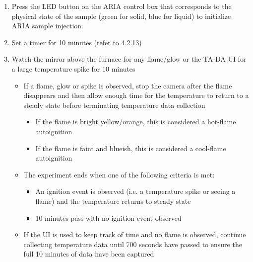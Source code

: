 \documentclass[letterpaper,11pt]{article}
\begin{document}
\begin{enumerate}
	\item Press the LED button on the ARIA control box that corresponds to the physical state of the sample
		(green for solid, blue for liquid) to initialize ARIA sample injection.
	
	\item Set a timer for 10 minutes (refer to 4.2.13)
            
    \item Watch the mirror above the furnace for any flame/glow or the TA-DA UI
        for a large temperature spike for 10 minutes
        \begin{itemize}
        \item If a flame, glow or spike is observed, stop the camera after the 
            flame disappears and then allow enough time for the temperature to 
            return to a steady state before terminating temperature data 
            collection
                \begin{itemize}
                \item If the flame is bright yellow/orange, this is considered a 
                    hot-flame autoignition
                \item If the flame is faint and blueish, this is considered a 
                    cool-flame autoignition
                \end{itemize}
        
        \item The experiment ends when one of the following criteria is met:
            \begin{itemize} 
            \item An ignition event is observed (i.e. a temperature spike or 
                seeing a flame) and the temperature returns to steady state
            \item 10 minutes pass with no ignition event observed
            \end{itemize}
        \item If the UI is used to keep track of time and no flame is observed, 
            continue collecting temperature data until 700 seconds have passed 
            to ensure the full 10 minutes of data have been captured
        \end{itemize}
    

\end{enumerate}
\end{document}
